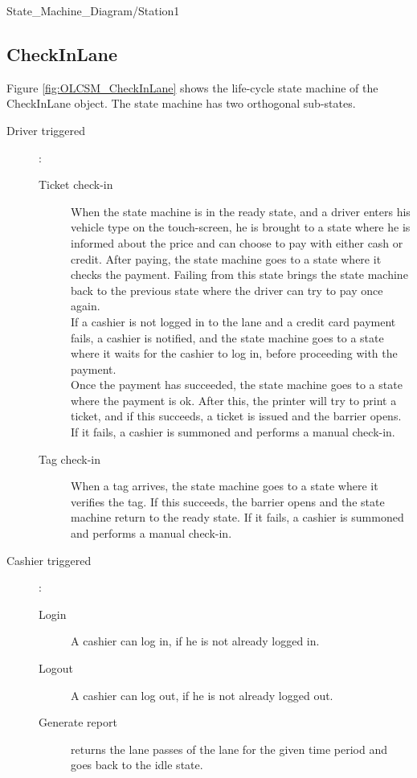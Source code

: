 \begin{myfigure}{State_Machine_Diagram/Station}{1}
\caption{Object Life Cycle State Machine Station. \madeby{\jb}{\mt}}
\label{fig:OLCSM_Station}

\end{myfigure}

\subsection{CheckInLane}
\madeby{\jb}{\mt}
Figure \ref{fig:OLCSM_CheckInLane} shows the life-cycle state machine of the CheckInLane object. The state machine has two orthogonal sub-states.

\begin{description}
  \item[Driver triggered] :
	
	  \begin{description}	
		\item[Ticket check-in] When the state machine is in the ready state, and a driver enters his vehicle type on the touch-screen, he is brought to a state where he is informed about the price and can choose to pay with either cash or credit. After paying, the state machine goes to a state where it checks the payment. Failing from this state brings the state machine back to the previous state where the driver can try to pay once again. 
\\If a cashier is not logged in to the lane and a credit card payment fails, a cashier is notified, and the state machine goes to a state where it waits for the cashier to log in, before proceeding with the payment.
\\Once the payment has succeeded, the state machine goes to a state where the payment is ok. After this, the printer will try to print a ticket, and if this succeeds, a ticket is issued and the barrier opens. If it fails, a cashier is summoned and performs a manual check-in.
	
	\item[Tag check-in] When a tag arrives, the state machine goes to a state where it verifies the tag. If this succeeds, the barrier opens and the state machine return to the ready state. If it fails, a cashier is summoned and performs a manual check-in.
	
	\end{description}
	
  \item[Cashier triggered] :
	
	\begin{description}
	
	\item[Login] A cashier can log in, if he is not already logged in.
	
	\item[Logout] A cashier can log out, if he is not already logged out.
	
	\item[Generate report] returns the lane passes of the lane for the given time period and goes back to the idle state.
	
	\end{description}
\end{description}

